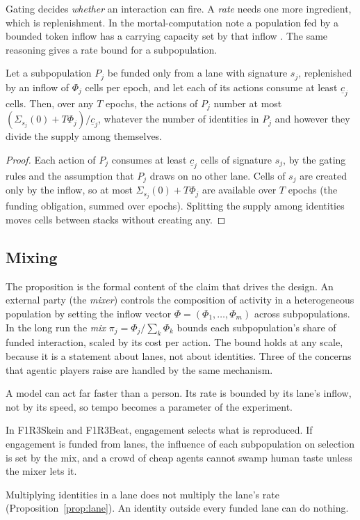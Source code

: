 \documentclass[11pt,a4paper]{article}
\begin{document}
Gating decides \emph{whether} an interaction can fire. A \emph{rate} needs one more ingredient,
which is replenishment. In the mortal-computation note a population fed by a bounded token inflow
has a carrying capacity set by that inflow \cite{mortal}. The same reasoning gives a rate bound for
a subpopulation.

\begin{proposition}\label{prop:lane}
Let a subpopulation $P_j$ be funded only from a lane with signature $s_j$, replenished by an inflow
of $\Phi_j$ cells per epoch, and let each of its actions consume at least $\underline{c}_j$ cells.
Then, over any $T$ epochs, the actions of $P_j$ number at most
$(\Sigma_{s_j}(0) + T\Phi_j)/\underline{c}_j$, whatever the number of identities in $P_j$ and
however they divide the supply among themselves.
\end{proposition}

\begin{proof}
Each action of $P_j$ consumes at least $\underline{c}_j$ cells of signature $s_j$, by the gating
rules and the assumption that $P_j$ draws on no other lane. Cells of $s_j$ are created only by
the inflow, so at most $\Sigma_{s_j}(0)+T\Phi_j$ are available over $T$ epochs (the funding
obligation, summed over epochs). Splitting the supply among identities moves cells between stacks
without creating any.
\end{proof}

\subsection{Mixing}

The proposition is the formal content of the claim that drives the design. An external party (the
\emph{mixer}) controls the composition of activity in a heterogeneous population by setting the
inflow vector $\Phi=(\Phi_1,\dots,\Phi_m)$ across subpopulations. In the long run the
\emph{mix} $\pi_j=\Phi_j/\sum_k\Phi_k$ bounds each subpopulation's share of funded interaction,
scaled by its cost per action. The bound holds at any scale, because it is a statement about lanes,
not about identities. Three of the concerns that agentic players raise are handled by the same
mechanism.

\begin{description}[leftmargin=1.2em,itemsep=3pt,font=\normalfont\spartansemi]
\item[Tempo.] A model can act far faster than a person. Its rate is bounded by its lane's inflow,
  not by its speed, so tempo becomes a parameter of the experiment.
\item[Selection pressure.] In F1R3Skein and F1R3Beat, engagement selects what is reproduced. If
  engagement is funded from lanes, the influence of each subpopulation on selection is set by the
  mix, and a crowd of cheap agents cannot swamp human taste unless the mixer lets it.
\item[Sybil attacks.] Multiplying identities in a lane does not multiply the lane's rate
  (Proposition~\ref{prop:lane}). An identity outside every funded lane can do nothing.
\end{description}
\end{document}
